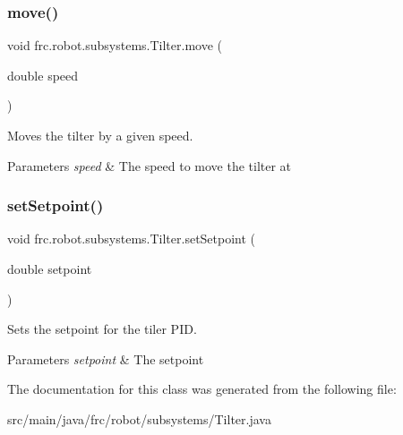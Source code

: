 \subsubsection{\texorpdfstring{move()}{move()}}
{\footnotesize\ttfamily void frc.\+robot.\+subsystems.\+Tilter.\+move (\begin{DoxyParamCaption}\item[{double}]{speed }\end{DoxyParamCaption})\hspace{0.3cm}{\ttfamily [inline]}}



Moves the tilter by a given speed. 


\begin{DoxyParams}{Parameters}
{\em speed} & The speed to move the tilter at \\
\hline
\end{DoxyParams}
\mbox{\label{classfrc_1_1robot_1_1subsystems_1_1_tilter_a70893e12c662ea63ee1ebf3be8704b5f}} 
\subsubsection{\texorpdfstring{setSetpoint()}{setSetpoint()}}
{\footnotesize\ttfamily void frc.\+robot.\+subsystems.\+Tilter.\+set\+Setpoint (\begin{DoxyParamCaption}\item[{double}]{setpoint }\end{DoxyParamCaption})\hspace{0.3cm}{\ttfamily [inline]}}



Sets the setpoint for the tiler P\+ID. 


\begin{DoxyParams}{Parameters}
{\em setpoint} & The setpoint \\
\hline
\end{DoxyParams}


The documentation for this class was generated from the following file\+:\begin{DoxyCompactItemize}
\item 
src/main/java/frc/robot/subsystems/Tilter.\+java\end{DoxyCompactItemize}
